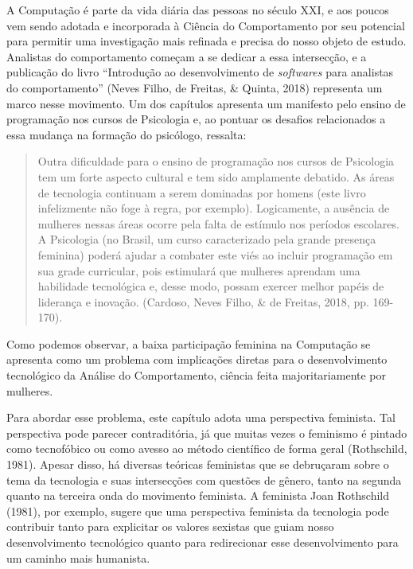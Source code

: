 A Computação é parte da vida diária das pessoas no século XXI, e aos poucos vem sendo adotada e incorporada à Ciência do Comportamento por seu potencial para permitir uma investigação mais refinada e precisa do nosso objeto de estudo. Analistas do comportamento começam a se dedicar a essa intersecção, e a publicação do livro “Introdução ao desenvolvimento de \textit{softwares} para analistas do comportamento” (Neves Filho, de Freitas, \& Quinta, 2018) representa um marco nesse movimento. Um dos capítulos apresenta um manifesto pelo ensino de programação nos cursos de Psicologia e, ao pontuar os desafios relacionados a essa mudança na formação do psicólogo, ressalta:

\begin{quote}
    Outra dificuldade para o ensino de programação nos cursos de Psicologia tem um forte aspecto cultural e tem sido amplamente debatido. As áreas de tecnologia continuam a serem dominadas por homens (este livro infelizmente não foge à regra, por exemplo). Logicamente, a ausência de mulheres nessas áreas ocorre pela falta de estímulo nos períodos escolares. A Psicologia (no Brasil, um curso caracterizado pela grande presença feminina) poderá ajudar a combater este viés ao incluir programação em sua grade curricular, pois estimulará que mulheres aprendam uma habilidade tecnológica e, desse modo, possam exercer melhor papéis de liderança e inovação. (Cardoso, Neves Filho, \& de Freitas, 2018, pp. 169-170).
\end{quote}

Como podemos observar, a baixa participação feminina na Computação se apresenta como um problema com implicações diretas para o desenvolvimento tecnológico da Análise do Comportamento, ciência feita majoritariamente por mulheres. 

Para abordar esse problema, este capítulo adota uma perspectiva feminista. Tal perspectiva pode parecer contraditória, já que muitas vezes o feminismo é pintado como tecnofóbico ou como avesso ao método científico de forma geral (Rothschild, 1981). Apesar disso, há diversas teóricas feministas que se debruçaram sobre o tema da tecnologia e suas intersecções com questões de gênero, tanto na segunda quanto na terceira onda do movimento feminista. A feminista Joan Rothschild (1981), por exemplo, sugere que uma perspectiva feminista da tecnologia pode contribuir tanto para explicitar os valores sexistas que guiam nosso desenvolvimento tecnológico quanto para redirecionar esse desenvolvimento para um caminho mais humanista. 

